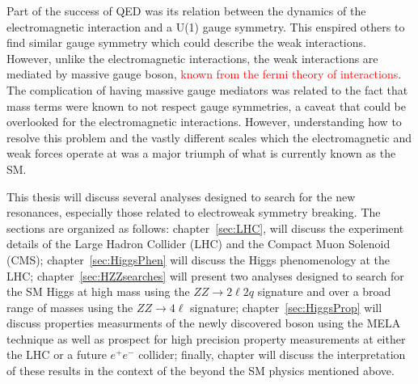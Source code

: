 Part of the success of QED was its relation between the dynamics of the 
electromagnetic interaction and a U(1) gauge symmetry.  This enspired 
others to find similar gauge symmetry which could describe the weak 
interactions.  However, unlike the electromagnetic interactions, the 
weak interactions are mediated by massive gauge boson, 
\textcolor{red}{known from the fermi theory of interactions}.  The 
complication of having massive gauge mediators was 
related to the fact that mass terms were known to not respect gauge 
symmetries, a caveat that could be overlooked for the electromagnetic 
interactions. However, understanding how to resolve this problem and the
vastly different scales which the electromagnetic and weak forces operate
at was a major triumph of what is currently known as the SM.

This thesis will discuss several analyses designed to search for the
new resonances, especially those related to electroweak symmetry 
breaking. The sections are organized as follows: chapter~\ref{sec:LHC}, will 
discuss the experiment details of the Large Hadron Collider (LHC) and 
the Compact Muon Solenoid (CMS); chapter~\ref{sec:HiggsPhen} will discuss 
the Higgs phenomenology at the LHC; chapter~\ref{sec:HZZsearches} will
present two analyses designed to search for the SM Higgs at high mass
using the $ZZ\to2\ell 2q$ signature and over a broad range of masses
using the $ZZ\to 4\ell$ signature; chapter~\ref{sec:HiggsProp} will discuss
properties measurments of the newly discovered boson using the MELA 
technique as well as prospect for high precision property measurements
at either the LHC or a future $e^+e^-$ collider; finally, chapter will
discuss the interpretation of these results in the context of the 
beyond the SM physics mentioned above.  
